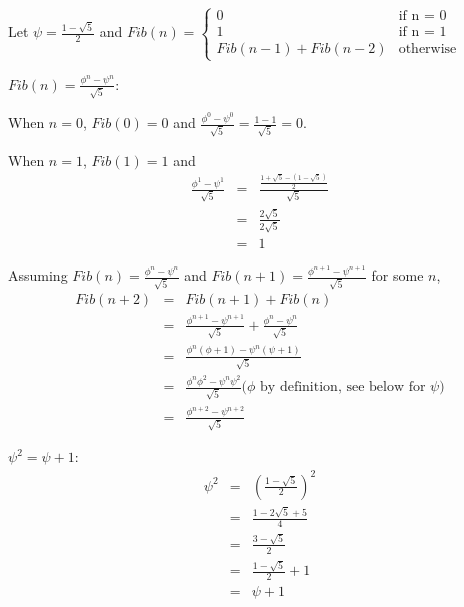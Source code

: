 \documentclass{minimal}
\begin{document}
Let $\psi = \frac{1 - \sqrt{5}}{2}$ and
\begin{math}
  Fib(n) = 
    \begin{cases}
      0 & \text{if n = 0}\\
      1 & \text{if n = 1}\\
      Fib(n-1) + Fib(n-2) & \text{otherwise}
    \end{cases}
\end{math}


$Fib(n) = \frac{\phi^n - \psi^n}{\sqrt{5}}$:

When $n = 0$, $Fib(0) = 0$ and $\frac{\phi^0 - \psi^0}{\sqrt{5}} =
\frac{1 - 1}{\sqrt{5}} = 0$.

When $n = 1$, $Fib(1) = 1$ and
\begin{eqnarray*}
  \frac{\phi^1 - \psi^1}{\sqrt{5}} &=& \frac{\frac{1 + \sqrt{5} - (1 - \sqrt{5})}{2}}{\sqrt{5}}
                                \\ &=& \frac{2\sqrt{5}}{2\sqrt{5}}
                                \\ &=& 1
\end{eqnarray*}

Assuming $Fib(n) = \frac{\phi^n - \psi^n}{\sqrt{5}}$ and $Fib(n+1) =
\frac{\phi^{n+1} - \psi^{n+1}}{\sqrt{5}}$ for some $n$,
\begin{eqnarray*}
  Fib(n+2) &=& Fib(n+1) + Fib(n)
        \\ &=& \frac{\phi^{n+1} - \psi^{n+1}}{\sqrt{5}} + \frac{\phi^n - \psi^n}{\sqrt{5}}
        \\ &=& \frac{\phi^n(\phi+1) - \psi^n(\psi+1)}{\sqrt{5}}
        \\ &=& \frac{\phi^n\phi^2 - \psi^n\psi^2}{\sqrt{5}}
        \text{($\phi$ by definition, see below for $\psi$)}
        \\ &=& \frac{\phi^{n+2} - \psi^{n+2}}{\sqrt{5}}
\end{eqnarray*}

$\psi^2 = \psi+1$:
\begin{eqnarray*}
  \psi^2 &=& \left(\frac{1-\sqrt{5}}{2}\right)^2
      \\ &=& \frac{1-2\sqrt{5}+5}{4}
      \\ &=& \frac{3-\sqrt{5}}{2}
      \\ &=& \frac{1-\sqrt{5}}{2} + 1
      \\ &=& \psi + 1
\end{eqnarray*}

\end{document}

